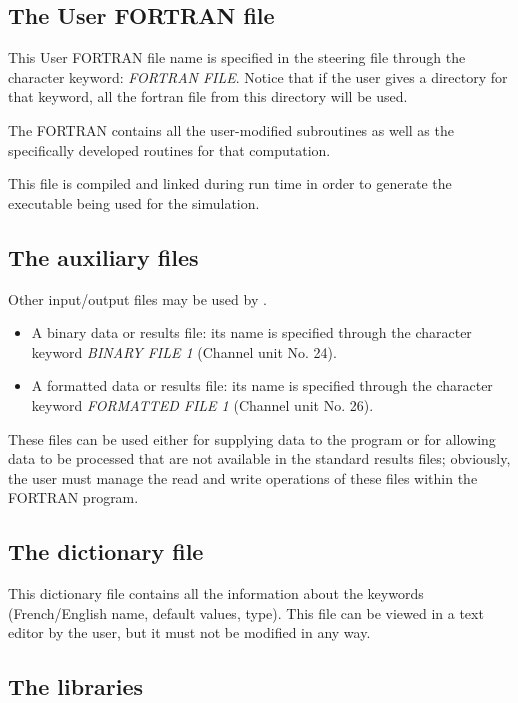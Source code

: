 \subsection{ The User FORTRAN file}

This User FORTRAN file name is specified in the steering file through the character
keyword: \textit{FORTRAN FILE}. Notice that if the user gives a directory for that
keyword, all the fortran file from this directory will be used.  

The FORTRAN contains all the user-modified \tomawac subroutines as well as the
specifically developed routines for that computation.

This file is compiled and linked during run time in order to generate the executable
being used for the simulation.


\subsection{ The auxiliary files}

 Other input/output files may be used by \tomawac.

\begin{itemize}
\item  A binary data or results file: its name is specified through the character
  keyword \textit{BINARY FILE 1} (Channel unit No. 24).
\item  A formatted data or results file: its name is specified through the character
  keyword \textit{FORMATTED FILE 1} (Channel unit No. 26).
\end{itemize}

These files can be used either for supplying data to the program or for allowing data
to be processed that are not available in the standard results files; obviously, the
user must manage the read and write operations of these files within the FORTRAN program.


\subsection{ The dictionary file}

This dictionary file contains all the information about the keywords (French/English
name, default values, type). This file can be viewed in a text editor by the user,
but it must not be modified in any way.


\subsection{ The libraries}

